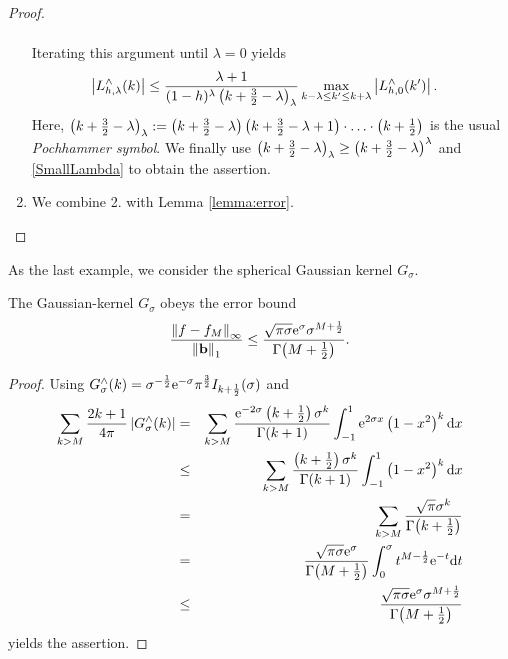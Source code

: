 \begin{proof}
\begin{enumerate}
\begin{eqnarray*}
    \end{eqnarray*}
    Iterating this argument until $\lambda = 0$ yields
    \begin{align*}
      \left|L_{h,\lambda}^{\wedge}{\hspace{-0.4ex}}\left(k\right)\right|
      & \le \frac{\lambda+1}{(1-h)^{\lambda}
        \left(k+\frac{3}{2}-\lambda\right)_{\lambda}} 
        \max_{k-\lambda \le k' \le k+\lambda} 
        \left\vert L_{h,0}^{\wedge}{\hspace{-0.4ex}}\left(k'\right)\right\vert.
    \end{align*}
    Here, $\left(k+\frac{3}{2}-\lambda\right)_{\lambda} := 
    \left(k+\frac{3}{2}-\lambda\right) \left(k+\frac{3}{2}-\lambda+1\right)
    \cdot \ldots \cdot 
    \left(k+\frac{1}{2}\right)$ is the usual \emph{Pochhammer symbol}. We finally use 
    $\left(k+\frac{3}{2}-\lambda\right)_{\lambda} \ge
    \left(k+\frac{3}{2}-\lambda\right)^{\lambda}$ and 
    \eqref{SmallLambda} to obtain the assertion.
  \item We combine 2. with Lemma \ref{lemma:error}. 
  \end{enumerate}
\end{proof}

As the last example, we consider the spherical Gaussian kernel $G_{\sigma}$. 

\begin{lemma}
  The Gaussian-kernel $G_{\sigma}$ obeys the error bound
  \begin{equation}
    \label{error:G}
    \frac{\left\|f - f_{M}\right\|_{\infty}}{\left\|\mathbf{b}\right\|_1} \le 
    \frac{\sqrt{\pi\sigma}\mbox{\rm{e}}^{\sigma} \sigma^{M+\frac{1}{2}}}{\Gamma{\hspace{-0.4ex}}\left(M
    +\frac{1}{2}\right)}.
  \end{equation} 
\end{lemma}
\begin{proof}
  Using $G_{\sigma}^{\wedge}{\hspace{-0.4ex}}\left(k\right) = \sigma^{-\frac{1}{2}} \mbox{\rm{e}}^{-\sigma}
  \pi^{\frac{3}{2}} I_{k+\frac{1}{2}}{\hspace{-0.4ex}}\left(\sigma\right)$ and
  \begin{eqnarray*}
    \sum_{k>M} \frac{2k+1}{4\pi} \left\vert G_{\sigma}^{\wedge}{\hspace{-0.4ex}}\left(k\right)\right\vert
    &=&
    \sum_{k>M} \frac{\mbox{\rm{e}}^{-2\sigma}
    \left(k+\frac{1}{2}\right)\sigma^k}{\Gamma{\hspace{-0.4ex}}\left(k+1\right)} \int_{-1}^{1}
    \mbox{\rm{e}}^{2\sigma x} \left(1-x^2\right)^k \text{\rm{d}} x\\
    &\le&
    \sum_{k>M} \frac{\left(k+\frac{1}{2}\right)\sigma^k}{\Gamma{\hspace{-0.4ex}}\left(k+1\right)}
    \int_{-1}^{1} \left(1-x^2\right)^k \text{\rm{d}} x\\
    &=&
    \sum_{k>M} \frac{\sqrt{\pi}\sigma^k}{\Gamma{\hspace{-0.4ex}}\left(k+\frac{1}{2}\right)}\\
    &=&
    \frac{\sqrt{\pi\sigma}\mbox{\rm{e}}^{\sigma}}{\Gamma{\hspace{-0.4ex}}\left(M+\frac{1}{2}\right)} 
    \int_{0}^{\sigma} t^{M-\frac{1}{2}} \mbox{\rm{e}}^{-t} \text{\rm{d}} t\\
    &\le&
    \frac{\sqrt{\pi\sigma}\mbox{\rm{e}}^{\sigma} \sigma^{M+\frac{1}{2}}}{\Gamma{\hspace{-0.4ex}}\left(M
    +\frac{1}{2}\right)}
  \end{eqnarray*}
  yields the assertion.
\end{proof}


